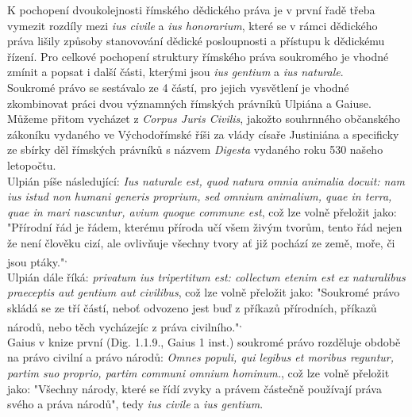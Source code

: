 \documentclass{article}
\begin{document}
K pochopení dvoukolejnosti římského dědického práva je v první řadě třeba vymezit rozdíly mezi \textit{ius civile} a \textit{ius honorarium}, které se v rámci dědického práva lišily způsoby stanovování dědické posloupnosti a přístupu k dědickému řízení. Pro celkové pochopení struktury římského práva soukromého je vhodné zmínit a popsat i další části, kterými jsou \textit{ius gentium} a \textit{ius naturale}. \\

Soukromé právo se sestávalo ze 4 částí, pro jejich vysvětlení je vhodné zkombinovat práci dvou významných římských právníků Ulpiána a Gaiuse. Můžeme přitom vycházet z \textit{Corpus Juris Civilis}, jakožto souhrnného občanského zákoníku vydaného ve Východořímské říši za vlády císaře Justiniána a specificky ze sbírky děl římských právníků s názvem \textit{Digesta} vydaného roku 530 našeho letopočtu. \\


Ulpián píše následující: \textit{Ius naturale est, quod natura omnia animalia docuit: nam ius istud non humani generis proprium, sed omnium animalium, quae in terra, quae in mari nascuntur, avium quoque commune est}, což lze volně přeložit jako: "Přírodní řád je řádem, kterému příroda učí všem živým tvorům, tento řád nejen že není člověku cizí, ale ovlivňuje všechny tvory ať již pochází ze země, moře, či jsou ptáky."\textsuperscript{,} \\

Ulpián dále říká: \textit{privatum ius tripertitum est: collectum etenim est ex naturalibus praeceptis aut gentium aut civilibus}, což lze volně přeložit jako: "Soukromé právo skládá se ze tří částí, neboť odvozeno jest buď z příkazů přírodních, příkazů národů, nebo těch vycházejíc z práva civilního."\textsuperscript{,} \\

Gaius v knize první (Dig. 1.1.9., Gaius 1 inst.) soukromé právo rozděluje obdobě na právo civilní a právo národů: \textit{Omnes populi, qui legibus et moribus reguntur, partim suo proprio, partim communi omnium hominum.}, což lze volně přeložit jako: "Všechny národy, které se řídí zvyky a právem částečně používají práva svého a práva národů", tedy \textit{ius civile} a \textit{ius gentium}. \\
\end{document}
